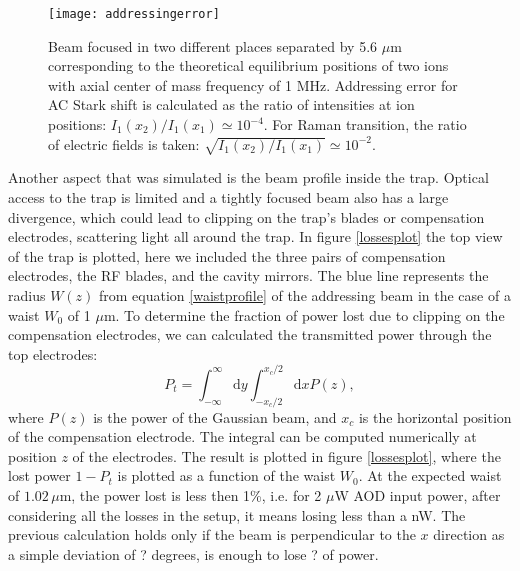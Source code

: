  \begin{figure}
 \centering
 \texttt{[image: addressingerror]}
 \caption{Beam focused in two different places separated by 5.6 $\mu$m corresponding to the theoretical equilibrium positions of two ions with axial center of mass frequency of 1 MHz. Addressing error for AC Stark shift is calculated as the ratio of intensities at ion positions: $I_1(x_2)/I_1(x_1) \simeq 10^{-4}$. For Raman transition, the ratio of electric fields is taken: $\sqrt{I_1(x_2)/I_1(x_1)} \simeq 10^{-2}$.}
 \label{zemaxaddrerror.png}
 \end{figure}
Another aspect that was simulated is the beam profile inside the trap. Optical access to the trap is limited and a tightly focused beam also has a large divergence, which could lead to clipping on the trap's blades or compensation electrodes, scattering light all around the trap. In figure \ref{lossesplot} the top view of the trap is plotted, here we included the three pairs of compensation electrodes, the RF blades, and the cavity mirrors. The blue line represents the radius $W(z)$ from equation \ref{waistprofile} of the addressing beam in the case of a waist $W_0$ of 1 $\mu$m. To determine the fraction of power lost due to clipping on the compensation electrodes, we can calculated the transmitted power through the top electrodes:
\begin{equation}
P_{t} = \int_{-\infty}^{\infty}\text{d}y \int_{-x_c/2}^{x_c/2}\text{d}x P(z),
\end{equation}
where $P(z)$ is the power of the Gaussian beam, and $x_c$ is the horizontal position of the compensation electrode. The integral can be computed numerically at position $z$ of the electrodes. The result is plotted in figure \ref{lossesplot}, where the lost power $1-P_{t}$ is plotted as a function of the waist $W_0$. At the expected waist of $1.02\,\mu$m, the power lost is less then 1\%, i.e. for 2 $\mu$W AOD input power, after considering all the losses in the setup, it means losing less than a nW. The previous calculation holds only if the beam is perpendicular to the $x$ direction as a simple deviation of ? degrees, is enough to lose ? of power.
